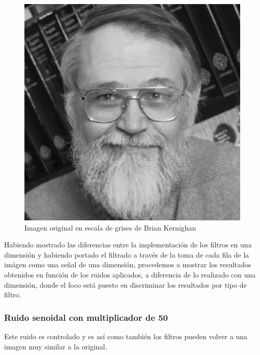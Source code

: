\begin{figure}[H]
\begin {center}
\includegraphics[width=360pt]{imagenes/brian_kernighan.png}
\end {center}
\caption{Imagen original en escala de grises de Brian Kernighan}
\label{fig:SinProm}
\end{figure}

Habiendo mostrado las diferencias entre la implementaci\'on de los filtros en
una dimensi\'on y habiendo portado el filtrado a trav\'es de la toma de cada
fila de la im\'agen como una se\~nal de una dimensi\'on, procedemos a mostrar
los resultados obtenidos en funci\'on de los ruidos aplicados, a diferencia de
lo realizado con una dimensi\'on, donde el foco est\'a puesto en discriminar los
resultados por tipo de filtro.

\subsubsection{Ruido senoidal con multiplicador de 50}

Este ruido es controlado y es as\'i como tambi\'en los filtros pueden volver a
una imagen muy similar a la original.

